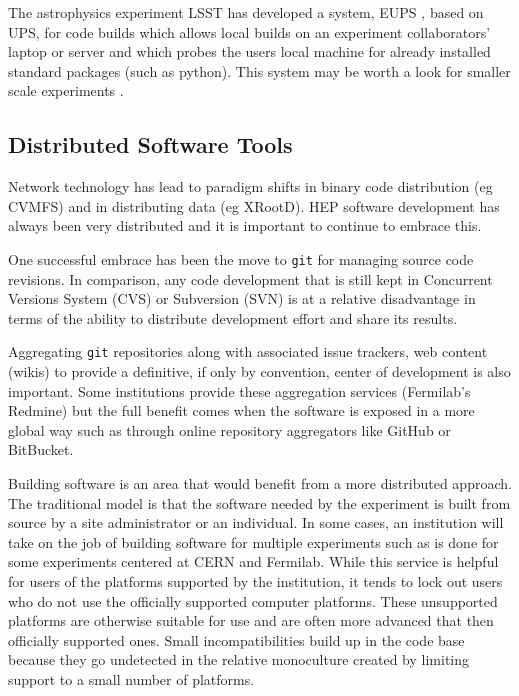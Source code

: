 The astrophysics experiment LSST has developed a system, EUPS \cite{lssteups}, 
based on UPS, for code builds which allows local builds on an experiment 
collaborators' laptop or server and which probes the users local machine 
for already installed standard packages (such as python).   This system
may be worth a look for smaller scale experiments \cite{lsstwiki}.

\subsection{Distributed Software Tools}

Network technology has lead to paradigm shifts in binary code
distribution (eg CVMFS) and in distributing data (eg XRootD).  HEP
software development has always been very distributed and it is
important to continue to embrace this.

One successful embrace has been the move to \texttt{git} for managing source
code revisions.  In comparison, any code development that is still
kept in Concurrent Versions System (CVS) or Subversion (SVN) is at a
relative disadvantage in terms of the ability to distribute
development effort and share its results.

Aggregating \texttt{git} repositories along with associated issue trackers, web
content (wikis) to provide a definitive, if only by convention, center
of development is also important.  Some institutions provide these
aggregation services (Fermilab's Redmine) but the full benefit comes
when the software is exposed in a more global way such as through
online repository aggregators like GitHub or BitBucket.

Building software is an area that would benefit from a more
distributed approach.  The traditional model is that the software
needed by the experiment is built from source by a site administrator
or an individual.  In some cases, an institution will take on the job
of building software for multiple experiments such as is done for some
experiments centered at CERN and Fermilab.  While this service is
helpful for users of the platforms supported by the institution, it
tends to lock out users who do not use the officially supported
computer platforms.  These unsupported platforms are otherwise
suitable for use and are often more advanced that then officially
supported ones.  Small incompatibilities build up in the code base
because they go undetected in the relative monoculture created by
limiting support to a small number of platforms.

